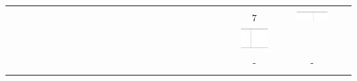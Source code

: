 \documentclass[10pt]{article}
\begin{document}
\begin{center}
\begin{tabular}{|c|c|c|c|c|c|c|c|c|c|c|c|c|c|c|c|c|c|c|c|c|c|c|c|c|c|c|c|c|c|}
 &  &  \\
\hline
 &  &  &  &  &  &  &  &  &  &  &  &  &  &  &  &  &  &  &  &  &  &  &  &  &  &  &  &  &  \\
\hline
 &  &  &  &  &  &  &  &  &  &  &  &  &  &  &  &  &  &  &  &  &  &  &  & \( 7 \) &  &  & \includegraphics[max width=\textwidth]{2024_11_21_2f72fc0c2faed8928619g-16(3)}
 &  &  \\
\hline
 &  &  &  &  &  &  &  &  &  &  &  &  &  &  &  &  &  &  &  &  &  &  &  & \includegraphics[max width=\textwidth]{2024_11_21_2f72fc0c2faed8928619g-16(4)}
 &  &  &  &  &  \\
\hline
 &  &  &  &  &  &  &  &  &  &  &  &  &  &  &  &  &  &  &  &  &  &  &  & - &  &  & - &  &  \\
\hline
 &  &  &  &  &  &  &  &  &  &  &  &  &  &  &  &  &  &  &  &  &  &  &  &  &  &  &  &  &  \\
\hline
\end{tabular}
\end{center}
\end{document}
